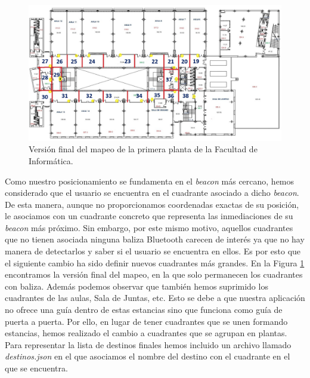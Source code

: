 \begin{figure}[t]
	\centering
	\includegraphics[width=1\textwidth]{Imagenes/Descripciondeltrabajo/mapeoPlanta1}
	\caption{Versión final del mapeo de la primera planta de la Facultad de Informática.}
	\label{fig:cuadrantesP1_v3}
\end{figure}


Como nuestro posicionamiento se fundamenta en el \textit{beacon} más cercano, hemos considerado que el usuario se encuentra en el cuadrante asociado a dicho \textit{beacon}. De esta manera, aunque no proporcionamos coordenadas exactas de su posición, le asociamos con un cuadrante concreto que representa las inmediaciones de su \textit{beacon} más próximo. Sin embargo, por este mismo motivo, aquellos cuadrantes que no tienen asociada ninguna baliza Bluetooth carecen de interés ya que no hay manera de detectarlos y saber si el usuario se encuentra en ellos. Es por esto que el siguiente cambio ha sido definir nuevos cuadrantes más grandes. En la Figura \ref{fig:cuadrantesP1_v3} encontramos la versión final del mapeo, en la que solo permanecen los cuadrantes con baliza. Además podemos observar que también hemos suprimido los cuadrantes de las aulas, Sala de Juntas, etc. Esto se debe a que nuestra aplicación no ofrece una guía dentro de estas estancias sino que funciona como guía de puerta a puerta. Por ello, en lugar de tener cuadrantes que se unen formando estancias, hemos realizado el cambio a cuadrantes que se agrupan en plantas. Para representar la lista de destinos finales hemos incluido un archivo llamado \textit{destinos.json} en el que asociamos el nombre del destino con el cuadrante en el que se encuentra.

